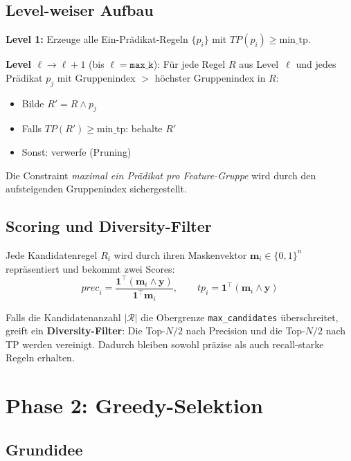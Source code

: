 \documentclass[11pt,a4paper]{article}
\begin{document}
\subsection{Level-weiser Aufbau}

\textbf{Level 1:} Erzeuge alle Ein-Pr\"adikat-Regeln $\{p_i\}$ mit $\mathit{TP}(p_i) \geq \text{min\_tp}$.

\medskip
\textbf{Level $\ell \to \ell+1$} (bis $\ell = \texttt{max\_k}$): F\"ur jede Regel $R$ aus Level~$\ell$ und jedes Pr\"adikat $p_j$ mit Gruppenindex $>$ h\"ochster Gruppenindex in $R$:
\begin{itemize}[nosep]
  \item Bilde $R' = R \land p_j$
  \item Falls $\mathit{TP}(R') \geq \text{min\_tp}$: behalte $R'$
  \item Sonst: verwerfe (Pruning)
\end{itemize}

\noindent Die Constraint \emph{maximal ein Pr\"adikat pro Feature-Gruppe} wird durch den aufsteigenden Gruppenindex sichergestellt.

\subsection{Scoring und Diversity-Filter}

Jede Kandidatenregel $R_i$ wird durch ihren Maskenvektor $\mathbf{m}_i \in \{0,1\}^n$ repr\"asentiert und bekommt zwei Scores:
\[
  \mathit{prec}_i = \frac{\mathbf{1}^\top(\mathbf{m}_i \wedge \mathbf{y})}{\mathbf{1}^\top \mathbf{m}_i}, \qquad
  \mathit{tp}_i = \mathbf{1}^\top(\mathbf{m}_i \wedge \mathbf{y})
\]

\noindent Falls die Kandidatenanzahl $|\mathcal{R}|$ die Obergrenze \texttt{max\_candidates} \"uberschreitet, greift ein \textbf{Diversity-Filter}: Die Top-$N/2$ nach Precision und die Top-$N/2$ nach TP werden vereinigt. Dadurch bleiben sowohl pr\"azise als auch recall-starke Regeln erhalten.

\section{Phase 2: Greedy-Selektion}

\subsection{Grundidee}
\end{document}
